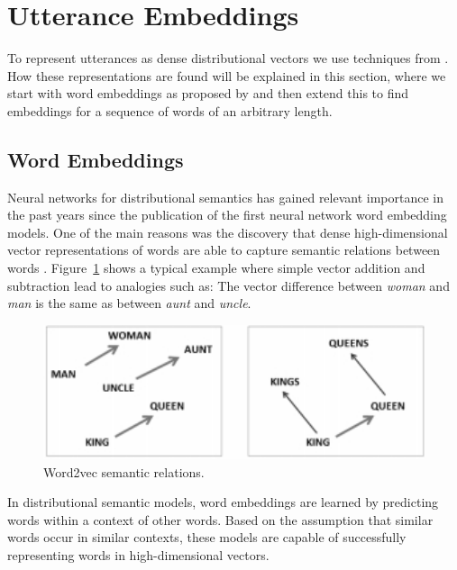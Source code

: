 \section{Utterance Embeddings}\label{sec:utt2vec}
To represent utterances as dense distributional vectors we use techniques from . How these representations are found will be explained in this section, where we start with word embeddings as proposed by  and then extend this to find embeddings for a sequence of words of an arbitrary length.

\subsection{Word Embeddings}
Neural networks for distributional semantics has gained relevant importance in the past years since the publication of the first neural network word embedding models.
One of the main reasons was the discovery that dense high-dimensional vector representations of words are able to capture semantic relations between words \cite{mikolov2013efficient}.
Figure~\ref{fig:w2v_example} shows a typical example where simple vector addition and subtraction lead to analogies such as: The vector difference between \textit{woman} and \textit{man} is the same as between \textit{aunt} and \textit{uncle}.


\begin{figure}
\centering
\begin{minipage}{.4\textwidth}
\includegraphics[width=1\textwidth]{img/w2v_example}
\caption{Word2vec semantic relations.}
\label{fig:w2v_example}
\end{minipage}
\end{figure}

In distributional semantic models, word embeddings are learned by predicting words within a context of other words.
Based on the assumption that similar words occur in similar contexts, these models are capable of successfully representing words in high-dimensional vectors. 

